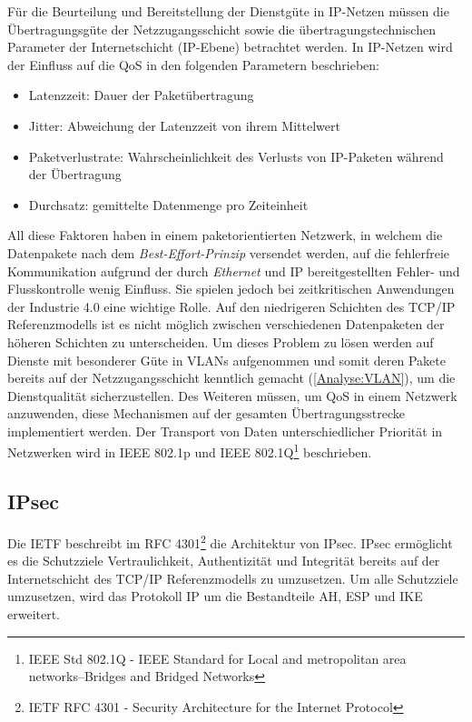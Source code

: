 Für die Beurteilung und Bereitstellung der Dienstgüte in \ac{IP}-Netzen müssen die Übertragungsgüte der Netzzugangsschicht sowie die übertragungstechnischen Parameter der Internetschicht (\ac{IP}-Ebene) betrachtet werden. In IP-Netzen wird der Einfluss auf die \ac{QoS} in den folgenden Parametern beschrieben:

\begin{itemize}
    \item Latenzzeit: Dauer der Paketübertragung
    \item Jitter: Abweichung der Latenzzeit von ihrem Mittelwert
    \item Paketverlustrate: Wahrscheinlichkeit des Verlusts von IP-Paketen während der Übertragung
    \item Durchsatz: gemittelte Datenmenge pro Zeiteinheit
\end{itemize}

All diese Faktoren haben in einem paketorientierten Netzwerk, in welchem die Datenpakete nach dem \textit{Best-Effort-Prinzip} versendet werden, auf die fehlerfreie Kommunikation aufgrund der durch \textit{Ethernet} und \ac{IP} bereitgestellten Fehler- und Flusskontrolle wenig Einfluss. Sie spielen jedoch bei zeitkritischen Anwendungen der Industrie 4.0 eine wichtige Rolle. Auf den niedrigeren Schichten des \ac{TCP}/\ac{IP} Referenzmodells ist es nicht möglich zwischen verschiedenen Datenpaketen der höheren Schichten zu unterscheiden. Um dieses Problem zu lösen werden auf Dienste mit besonderer Güte in \ac{VLAN}s aufgenommen und somit deren Pakete bereits auf der Netzzugangsschicht kenntlich gemacht (\autoref{Analyse:VLAN}), um die Dienstqualität sicherzustellen. Des Weiteren müssen, um \ac{QoS} in einem Netzwerk anzuwenden, diese Mechanismen auf der gesamten Übertragungsstrecke implementiert werden. Der Transport von Daten unterschiedlicher Priorität in Netzwerken wird in \ac{IEEE} 802.1p und \ac{IEEE} 802.1Q\footnote{IEEE Std 802.1Q - IEEE Standard for Local and metropolitan area networks--Bridges and Bridged Networks} beschrieben.

\subsection{IPsec}
Die \ac{IETF} beschreibt im \ac{RFC} 4301\footnote{IETF RFC 4301 - Security Architecture for the Internet Protocol} die Architektur von \ac{IPsec}. \ac{IPsec} ermöglicht es die Schutzziele Vertraulichkeit, Authentizität und Integrität bereits auf der Internetschicht des \ac{TCP}/\ac{IP} Referenzmodells zu umzusetzen. Um alle Schutzziele umzusetzen, wird das Protokoll \ac{IP} um die Bestandteile \ac{AH}, \ac{ESP} und \ac{IKE} erweitert.

